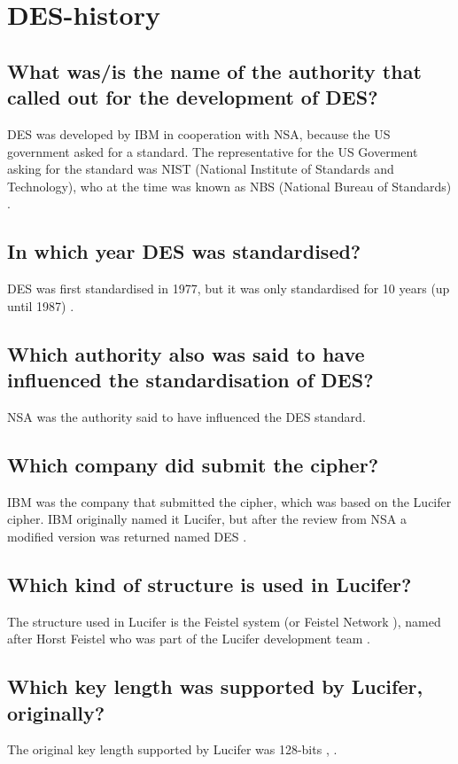 \section{DES-history}

\subsection{What was/is the name of the authority that called out for the development of DES?}
\label{section:1a}
DES was developed by IBM in cooperation with NSA, because the US government asked for a standard. 
The representative for the US Goverment asking for the standard was NIST (National Institute of Standards and Technology), 
who at  the time was known as NBS (National Bureau of Standards) \cite[p.~56]{Paar2010}.

\subsection{In which year DES was standardised?}
\label{section:1b}
DES was first standardised in 1977, but it was only standardised for 10 years (up until 1987) \cite[p.~56]{Paar2010}.

\subsection{Which authority also was said to have influenced the standardisation of DES?}
\label{section:1c}
NSA was the authority said to have influenced the DES standard.

\subsection{Which company did submit the cipher?}
\label{section:1d}
IBM was the company that submitted the cipher, which was based on the Lucifer cipher. 
IBM originally named it Lucifer, but after the review from NSA a modified version was returned named DES \cite[p.~113]{Trappe2006}.

\subsection{Which kind of structure is used in Lucifer?}
\label{section:1e}
The structure used in Lucifer is the Feistel system (or Feistel Network \cite[p.~58]{Paar2010}), named after Horst Feistel who was part of the Lucifer development team \cite[p.~114]{Trappe2006}.

\subsection{Which key length was supported by Lucifer, originally?}
\label{section:1f}
The original key length supported by Lucifer was 128-bits \cite[p.~276-277]{Menezes1997}, \cite[p.~56]{Paar2010}.

